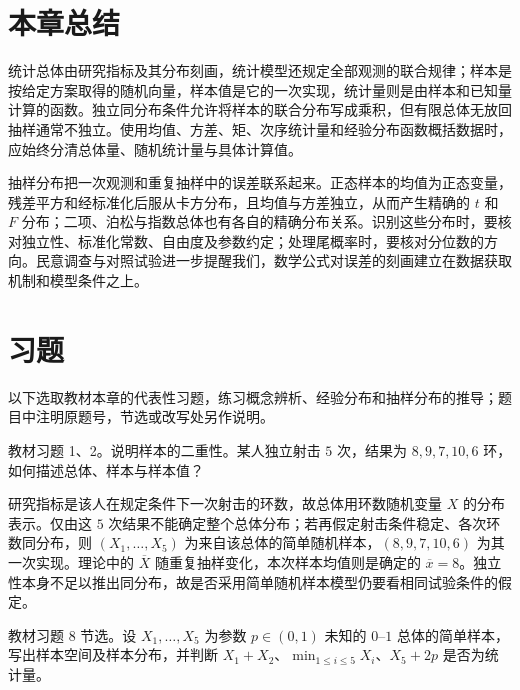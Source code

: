 \section*{本章总结}

统计总体由研究指标及其分布刻画，统计模型还规定全部观测的联合规律；样本是按给定方案取得的随机向量，样本值是它的一次实现，统计量则是由样本和已知量计算的函数。独立同分布条件允许将样本的联合分布写成乘积，但有限总体无放回抽样通常不独立。使用均值、方差、矩、次序统计量和经验分布函数概括数据时，应始终分清总体量、随机统计量与具体计算值。

抽样分布把一次观测和重复抽样中的误差联系起来。正态样本的均值为正态变量，残差平方和经标准化后服从卡方分布，且均值与方差独立，从而产生精确的 $t$ 和 $F$ 分布；二项、泊松与指数总体也有各自的精确分布关系。识别这些分布时，要核对独立性、标准化常数、自由度及参数约定；处理尾概率时，要核对分位数的方向。民意调查与对照试验进一步提醒我们，数学公式对误差的刻画建立在数据获取机制和模型条件之上。

\section*{习题}

以下选取教材本章的代表性习题，练习概念辨析、经验分布和抽样分布的推导；题目中注明原题号，节选或改写处另作说明。

\begin{example}
\label{ex:study-sample-duality-exercise}
教材习题 1、2。说明样本的二重性。某人独立射击 $5$ 次，结果为 $8,9,7,10,6$ 环，如何描述总体、样本与样本值？
\end{example}

\begin{solve}
研究指标是该人在规定条件下一次射击的环数，故总体用环数随机变量 $X$ 的分布表示。仅由这 $5$ 次结果不能确定整个总体分布；若再假定射击条件稳定、各次环数同分布，则 $(X_1,\ldots,X_5)$ 为来自该总体的简单随机样本，$(8,9,7,10,6)$ 为其一次实现。理论中的 $\overline X$ 随重复抽样变化，本次样本均值则是确定的 $\overline x=8$。独立性本身不足以推出同分布，故是否采用简单随机样本模型仍要看相同试验条件的假定。
\end{solve}

\begin{example}
\label{ex:study-bernoulli-statistic-exercise}
教材习题 8 节选。设 $X_1,\ldots,X_5$ 为参数 $p\in(0,1)$ 未知的 $0$--$1$ 总体的简单样本，写出样本空间及样本分布，并判断 $X_1+X_2$、$\min_{1\le i\le5}X_i$、$X_5+2p$ 是否为统计量。
\end{example}

